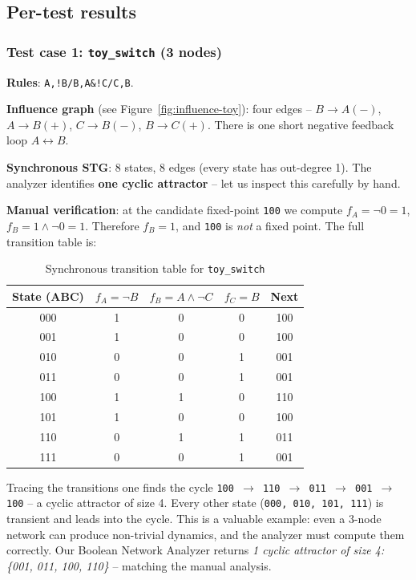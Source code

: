 \documentclass[oneside,final]{hcmut-report}
\begin{document}
\subsection{Per-test results}\label{subsec:results-each}

\subsubsection{Test case 1: \texttt{toy\_switch} (3 nodes)}

\textbf{Rules}: \texttt{A,!B/B,A\&!C/C,B}.

\textbf{Influence graph} (see Figure~\ref{fig:influence-toy}): four edges -- $B \to A(-)$, $A \to B(+)$, $C \to B(-)$, $B \to C(+)$. There is one short negative feedback loop $A \leftrightarrow B$.

\textbf{Synchronous STG}: 8 states, 8 edges (every state has out-degree 1). The analyzer identifies \textbf{one cyclic attractor} -- let us inspect this carefully by hand.

\textbf{Manual verification}: at the candidate fixed-point \texttt{100} we compute $f_A = \lnot 0 = 1$, $f_B = 1 \land \lnot 0 = 1$. Therefore $f_B = 1$, and \texttt{100} is \textit{not} a fixed point. The full transition table is:

\begin{table}[H]
    \centering
    \renewcommand{\arraystretch}{1.2}
    \begin{tabular}{|c|c|c|c|c|}
        \hline
        \rowcolor{bklight}
        \textbf{State (ABC)} & \textbf{$f_A=\lnot B$} & \textbf{$f_B=A\land\lnot C$} & \textbf{$f_C=B$} & \textbf{Next} \\
        \hline
        000 & 1 & 0 & 0 & 100 \\
        001 & 1 & 0 & 0 & 100 \\
        010 & 0 & 0 & 1 & 001 \\
        011 & 0 & 0 & 1 & 001 \\
        100 & 1 & 1 & 0 & 110 \\
        101 & 1 & 0 & 0 & 100 \\
        110 & 0 & 1 & 1 & 011 \\
        111 & 0 & 0 & 1 & 001 \\
        \hline
    \end{tabular}
    \caption{Synchronous transition table for \texttt{toy\_switch}}
    \label{tab:toy-trans}
\end{table}

Tracing the transitions one finds the cycle \texttt{100 $\to$ 110 $\to$ 011 $\to$ 001 $\to$ 100} -- a cyclic attractor of size 4. Every other state (\texttt{000, 010, 101, 111}) is transient and leads into the cycle. This is a valuable example: even a 3-node network can produce non-trivial dynamics, and the analyzer must compute them correctly. Our Boolean Network Analyzer returns \textit{1 cyclic attractor of size 4: \{001, 011, 100, 110\}} -- matching the manual analysis.
\end{document}
